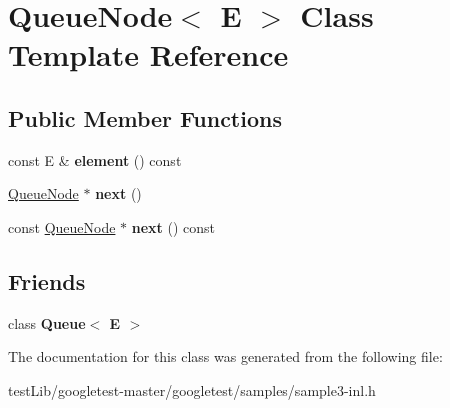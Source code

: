\hypertarget{classQueueNode}{}\section{Queue\+Node$<$ E $>$ Class Template Reference}
\label{classQueueNode}
\subsection*{Public Member Functions}
\begin{DoxyCompactItemize}
\item 
\mbox{\label{classQueueNode_a1c61b3ed32e089f5901b87022ef84985}} 
const E \& {\bfseries element} () const
\item 
\mbox{\label{classQueueNode_a8a9fdf488da06533360999ef85db56ea}} 
\hyperlink{classQueueNode}{Queue\+Node} $\ast$ {\bfseries next} ()
\item 
\mbox{\label{classQueueNode_ada477e4f309f29383112dbda473dd985}} 
const \hyperlink{classQueueNode}{Queue\+Node} $\ast$ {\bfseries next} () const
\end{DoxyCompactItemize}
\subsection*{Friends}
\begin{DoxyCompactItemize}
\item 
\mbox{\label{classQueueNode_ad4336229b1d7c3626e4ba69f236b202d}} 
class {\bfseries Queue$<$ E $>$}
\end{DoxyCompactItemize}


The documentation for this class was generated from the following file\+:\begin{DoxyCompactItemize}
\item 
test\+Lib/googletest-\/master/googletest/samples/sample3-\/inl.\+h\end{DoxyCompactItemize}
